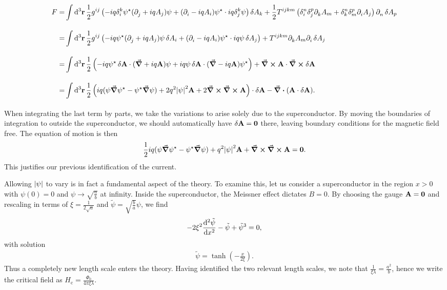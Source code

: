 \begin{align*}
	F =& \inte{}{}\dd[3]{\vb{r}}\frac{1}{2}g^{ij}\left(-iq\kdelta{k}{i}\psi\cc(\del{}{j} + iqA_{j})\psi + (\del{}{i} - iqA_{i})\psi\cc\cdot iq\kdelta{k}{j}\psi\right)\var{A_{k}} + \frac{1}{2}T^{ijkm}\left(\kdelta{n}{i}\kdelta{p}{j}\del{}{k}A_{m} + \kdelta{n}{k}\kdelta{p}{m}\del{}{i}A_{j}\right)\del{}{n}\var{A_{p}} \\
	=& \inte{}{}\dd[3]{\vb{r}}\frac{1}{2}g^{ij}\left(-iq\psi\cc(\del{}{j} + iqA_{j})\psi\var{A_{i}} + (\del{}{i} - iqA_{i})\psi\cc\cdot iq\psi\var{A_{j}}\right) + T^{ijkm}\del{}{k}A_{m}\del{}{i}\var{A_{j}} \\
	=& \inte{}{}\dd[3]{\vb{r}}\frac{1}{2}\left(-iq\psi\cc\var{\vb{A}}\cdot(\grad{} + iq\vb{A})\psi + iq\psi\var{\vb{A}}\cdot(\grad{} - iq\vb{A})\psi\cc\right) + \curl{\vb{A}}\cdot\curl{\var{\vb{A}}} \\
	=& \inte{}{}\dd[3]{\vb{r}}\frac{1}{2}\left(iq(\psi\grad{\psi\cc} - \psi\cc\grad{\psi}) + 2q^{2}\abs{\psi}^{2}\vb{A} + 2\curl{\curl{\vb{A}}}\right)\cdot\var{\vb{A}} - \div(\vb{A}\cdot\var{\vb{A}}).
\end{align*}
When integrating the last term by parts, we take the variations to arise solely due to the superconductor. By moving the boundaries of integration to outside the superconductor, we should automatically have $\var{\vb{A}} = \vb{0}$ there, leaving boundary conditions for the magnetic field free. The equation of motion is then
\begin{align*}
	\frac{1}{2}iq(\psi\grad{\psi\ensuremath{^{\star}}} - \psi^{\star}\grad{\psi}) + q^{2}\abs{\psi}^{2}\vb{A} + \curl{\curl{\vb{A}}} = \vb{0}.
\end{align*}
This justifies our previous identification of the current.

Allowing $\abs{\psi}$ to vary is in fact a fundamental aspect of the theory. To examine this, let us consider a superconductor in the region $x > 0$ with $\psi(0) = 0$ and $\psi\to\sqrt{\frac{a}{b}}$ at infinity. Inside the superconductor, the Meissner effect dictates $B = 0$. By choosing the gauge $\vb{A} = \vb{0}$ and rescaling in terms of $\xi = \frac{1}{2\sqrt{a}}$ and $\tilde{\psi} = \sqrt{\frac{b}{a}}\psi$, we find
\begin{align*}
	-2\xi^{2}\dv[2]{\tilde{\psi}}{x} - \tilde{\psi} + \tilde{\psi}^{3} = 0,
\end{align*}
with solution
\begin{align*}
	\tilde{\psi} = \tanh(-\frac{x}{2\xi}).
\end{align*}
Thus a completely new length scale enters the theory. Having identified the two relevant length scales, we note that $\frac{1}{\xi\lambda} = \frac{a^{2}}{b}$, hence we write the critical field as $H_{\text{c}} = \frac{\Phi_{0}}{4\pi\xi\lambda}$.

